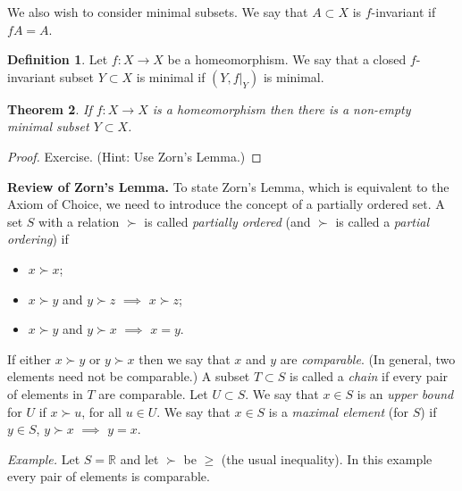 \documentclass[12pt]{article}
\newtheorem{theorem}{Theorem}[section]
\theoremstyle{definition}
\newtheorem{definition}[theorem]{Definition}
\theoremstyle{remark}
\begin{document}
\medskip
We also wish to consider minimal subsets. We say that $A \subset X$ is $f$-invariant if $fA=A$.

\begin{definition}
Let $f : X \to X$ be a homeomorphism. We say that a closed $f$-invariant subset $Y \subset X$ is minimal
if $(Y,f|_Y)$ is minimal.
\end{definition}

\begin{theorem} \label{minimal_sets_exist}
If $f : X \to X$ is a homeomorphism then there is a non-empty minimal subset $Y \subset X$.
\end{theorem}

\begin{proof}
Exercise. (Hint: Use Zorn's Lemma.)
\end{proof}


%
\noindent
{\bf Review of Zorn's Lemma.}
To state Zorn's Lemma, which is equivalent to the Axiom of Choice,
we need to introduce the concept of a partially
ordered set.
A set $S$ with a relation $\succ$ is called {\it partially ordered}
(and $\succ$ is called a {\it partial ordering}) if
\begin{itemize}
\item[(1)]
$x \succ x$;
\item[(2)]
$x \succ y$ and $y \succ z$ $\implies$ $x \succ z$;
\item[(3)]
$x \succ y$ and $y \succ x$ $\implies$ $x=y$.
\end{itemize}
If either $x \succ y$ or $y \succ x$ then we say that $x$ and $y$
are {\it comparable}. (In general, two elements need not be
comparable.)
A subset $T \subset S$ is called a {\it chain} if every pair
of elements in $T$ are comparable.
Let $U \subset S$. We say that $x \in S$ is an {\it upper bound}
for $U$ if $x \succ u$, for all $u \in U$.
We say that $x \in S$ is a {\it maximal element} (for $S$) if
$y \in S$, $y \succ x$ $\implies$ $y=x$.


\medskip
\noindent
{\it Example.}
Let $S=\mathbb R$ and let $\succ$ be $\geq$ (the usual inequality). 
In this example
every pair of elements is comparable. 
\end{document}
